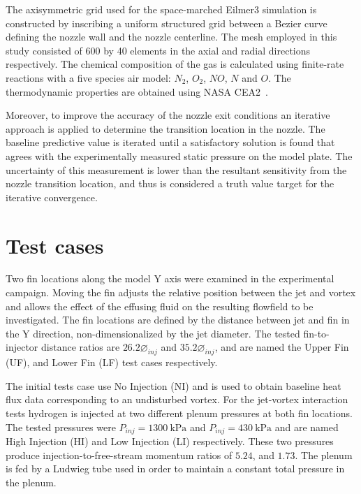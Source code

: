 \documentclass{AIAA}
\begin{document}
The axisymmetric grid used for the space-marched Eilmer3 simulation is constructed by inscribing a uniform structured grid between a Bezier curve defining the nozzle wall and the nozzle centerline.
The mesh employed in this study consisted of 600 by 40 elements in the axial and radial directions respectively.
The chemical composition of the gas is calculated using finite-rate reactions with a five species air model: $N_2$, $O_2$, $NO$, $N$ and $O$.
The thermodynamic properties are obtained using NASA CEA2~\cite{CEA2,Eilmer_TheoryBook}.

Moreover, to improve the accuracy of the nozzle exit conditions an iterative approach is applied to determine the transition location in the nozzle.
The baseline predictive value is iterated until a satisfactory solution is found that agrees with the experimentally measured static pressure on the model plate.
The uncertainty of this measurement is lower than the resultant sensitivity from the nozzle transition location, and thus is considered a truth value target for the iterative convergence\cite{Doherty:PhD_Thesis_Scram_M10}.


\section{Test cases}

Two fin locations along the model Y axis were examined in the experimental campaign.
Moving the fin adjusts the relative position between the jet and vortex and allows the effect of the effusing fluid on the resulting flowfield to be investigated.
The fin locations are defined by the distance between jet and fin in the Y direction, non-dimensionalized by the jet diameter.
The tested fin-to-injector distance ratios are $26.2\diameter_{inj}$ and $35.2\diameter_{inj}$, and are named the Upper Fin (UF), and Lower Fin (LF) test cases respectively.

The initial tests case use No Injection (NI) and is used to obtain baseline heat flux data corresponding to an undisturbed vortex.
For the jet-vortex interaction tests hydrogen is injected at two different plenum pressures at both fin locations.
The tested pressures were $P_{inj}=\SI{1300}{\kilo\pascal}$ and $P_{inj}=\SI{430}{\kilo\pascal}$ and are named High Injection (HI) and Low Injection (LI) respectively.
These two pressures produce injection-to-free-stream momentum ratios of $5.24$, and $1.73$.
The plenum is fed by a Ludwieg tube used in order to maintain a constant total pressure in the plenum.
\end{document}
